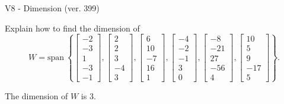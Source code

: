 \begin{exercise}
  \begin{exerciseTitle}V8 - Dimension (ver. 399)\end{exerciseTitle}
  \begin{exerciseStatement}
    Explain how to find the dimension of 
\[W=\mathrm{span}\ \left\{\left[\begin{array}{r}
-2 \\
-3 \\
1 \\
-3 \\
-1
\end{array}\right] , \left[\begin{array}{r}
2 \\
2 \\
3 \\
-4 \\
3
\end{array}\right] , \left[\begin{array}{r}
6 \\
10 \\
-7 \\
16 \\
1
\end{array}\right] , \left[\begin{array}{r}
-4 \\
-2 \\
-1 \\
3 \\
0
\end{array}\right] , \left[\begin{array}{r}
-8 \\
-21 \\
27 \\
-56 \\
4
\end{array}\right] , \left[\begin{array}{r}
10 \\
5 \\
9 \\
-17 \\
5
\end{array}\right]\right\}.\]



  \end{exerciseStatement}
  \begin{exerciseAnswer}
   The dimension of \(W\) is  \(3\).
  


  \end{exerciseAnswer}
\end{exercise}
